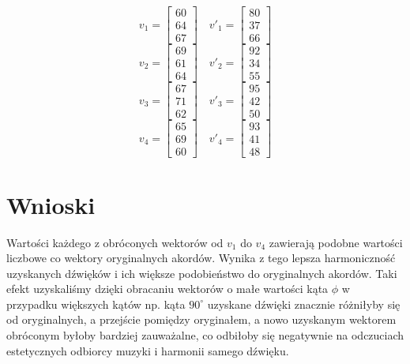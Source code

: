 \begin{equation*}
v_{1} =
    \begin{bmatrix}
     60 \\
     64 \\
     67
    \end{bmatrix}
    \quad
    v'_{1} =
    \begin{bmatrix}
     80 \\
     37 \\
     66
    \end{bmatrix}
\end{equation*}
\quad
\begin{equation*}
    v_{2} =
    \begin{bmatrix}
     69 \\
     61 \\
     64
    \end{bmatrix}
    \quad
    v'_{2} =
    \begin{bmatrix}
     92 \\
     34 \\
     55
    \end{bmatrix}
\end{equation*}
\quad
\begin{equation*}
    v_{3} =
    \begin{bmatrix}
     67 \\
     71 \\
     62
    \end{bmatrix}
    \quad
    v'_{3} =
    \begin{bmatrix}
     95 \\
     42 \\
     50
    \end{bmatrix}
\end{equation*}
\quad
\begin{equation*}
    v_{4} =
    \begin{bmatrix}
     65 \\
     69 \\
     60
    \end{bmatrix}
    \quad
    v'_{4} =
    \begin{bmatrix}
     93 \\
     41 \\
     48
    \end{bmatrix}
\end{equation*}


\section{Wnioski}
Wartości każdego z obróconych wektorów od $v_{1}$ do $v_{4}$ zawierają podobne wartości liczbowe co wektory oryginalnych akordów. Wynika z tego lepsza harmoniczność uzyskanych dźwięków  i ich większe podobieństwo do oryginalnych akordów. Taki efekt uzyskaliśmy dzięki obracaniu wektorów o małe wartości kąta $\phi$ w przypadku większych kątów np. kąta $90^{\circ}$ uzyskane dźwięki znacznie różniłyby się od oryginalnych, a przejście pomiędzy oryginałem, a nowo uzyskanym wektorem obróconym byłoby bardziej zauważalne, co odbiłoby się negatywnie na odczuciach estetycznych odbiorcy muzyki i harmonii samego dźwięku.

